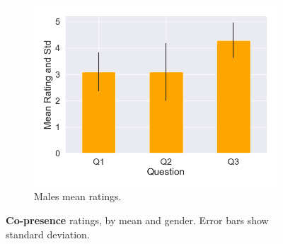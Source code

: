 \begin{figure}[H]
\begin{subfigure}[b]{0.5\textwidth}
 \label{fig:copresFemale}
 \end{subfigure}
  \hspace{10mm}
 \begin{subfigure}[b]{\textwidth}
 \centering
 \includegraphics[scale=0.5]{Files/Plots/copresence_mean_m.png}
 \caption{Males mean ratings.}
 \label{fig:copresMale}
 \end{subfigure}
 \caption{\textbf{Co-presence} ratings, by mean and gender. Error bars show standard deviation.}
\label{fig:coAll}
\end{figure}

